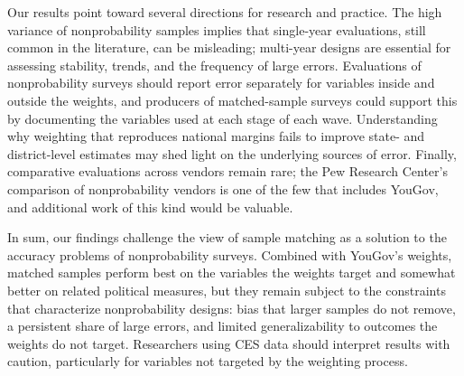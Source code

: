\documentclass[12pt]{article}
\begin{document}
Our results point toward several directions for research and practice. The high variance of nonprobability samples implies that single-year evaluations, still common in the literature, can be misleading; multi-year designs are essential for assessing stability, trends, and the frequency of large errors. Evaluations of nonprobability surveys should report error separately for variables inside and outside the weights, and producers of matched-sample surveys could support this by documenting the variables used at each stage of each wave. Understanding why weighting that reproduces national margins fails to improve state- and district-level estimates may shed light on the underlying sources of error. Finally, comparative evaluations across vendors remain rare; the Pew Research Center's comparison of nonprobability vendors \parencite{kennedy_evaluating_2016} is one of the few that includes YouGov, and additional work of this kind would be valuable.

In sum, our findings challenge the view of sample matching as a solution to the accuracy problems of nonprobability surveys. Combined with YouGov's weights, matched samples perform best on the variables the weights target and somewhat better on related political measures, but they remain subject to the constraints that characterize nonprobability designs: bias that larger samples do not remove, a persistent share of large errors, and limited generalizability to outcomes the weights do not target. Researchers using CES data should interpret results with caution, particularly for variables not targeted by the weighting process.


\end{document}
